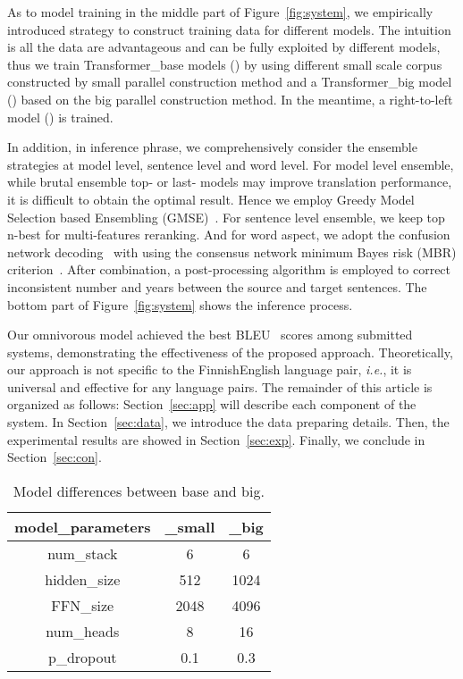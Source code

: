 \documentclass[11pt,a4paper]{article}
\begin{document}
  As to model training in the middle part of Figure~\ref{fig:system}, we empirically introduced  strategy to construct training data for different models. The intuition is all the data are advantageous and can be fully exploited by different models, thus we train  Transformer\_base models () by using different small scale corpus constructed by small parallel construction method and a Transformer\_big model () based on the big parallel construction method. In the meantime, a right-to-left model () is trained.
  
  In addition, in inference phrase, we comprehensively consider the ensemble strategies at model level, sentence level and word level. For model level ensemble, while brutal ensemble top- or last- models may improve translation performance, it is difficult to obtain the optimal result. Hence we employ Greedy Model Selection based Ensembling (GMSE)~\cite{partalas2008focused,deng-etal-2018-alibabas}. For sentence level ensemble, we keep top n-best for multi-features reranking. And for word aspect, we adopt the confusion network decoding~\cite{bangalore2001computing,matusov2006computing,sim2007consensus} with using the consensus network minimum Bayes risk (MBR) criterion~\cite{sim2007consensus}. After combination, a post-processing algorithm is employed to correct inconsistent number and years between the source and target sentences. The bottom part of Figure~\ref{fig:system} shows the inference process.
  
  Our omnivorous model achieved the best BLEU~\cite{papineni2002bleu} scores among submitted systems, demonstrating the effectiveness of the proposed approach. Theoretically, our approach is not specific to the FinnishEnglish language pair, \textit{i.e.}, it is universal and effective for any language pairs. The remainder of this article is organized as follows: Section~\ref{sec:app} will describe each component of the system. In Section~\ref{sec:data}, we introduce the data preparing details. Then, the experimental results are showed in Section~\ref{sec:exp}. Finally, we conclude in Section~\ref{sec:con}.
  

\begin{table}[t!]
    \begin{center}
    \begin{tabular}{c|c|c}
    \hline 
    model\_parameters & \_{small} & \_{big} \\
    \hline
    num\_stack & 6 & 6\\ 
    \hline
    hidden\_size & 512 & 1024\\
    \hline
    FFN\_size & 2048 & 4096\\
    \hline
    num\_heads & 8 & 16\\
    \hline
    p\_dropout & 0.1 & 0.3\\
    \hline
    \end{tabular}
    \end{center}
    \caption{\label{tab:models}Model differences between base and big.}
\end{table}
\end{document}
